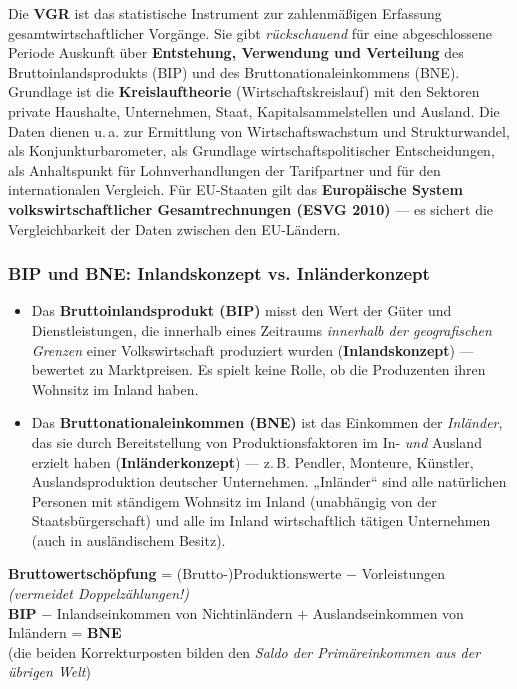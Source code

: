 \documentclass[11pt, a4paper]{article}
\begin{document}
Die \textbf{VGR} ist das statistische Instrument zur zahlenmäßigen Erfassung
gesamtwirtschaftlicher Vorgänge. Sie gibt \emph{rückschauend} für eine abgeschlossene
Periode Auskunft über \textbf{Entstehung, Verwendung und Verteilung} des
Bruttoinlandsprodukts (BIP) und des Bruttonationaleinkommens (BNE). Grundlage ist die
\textbf{Kreislauftheorie} (Wirtschaftskreislauf) mit den Sektoren private Haushalte,
Unternehmen, Staat, Kapitalsammelstellen und Ausland. Die Daten dienen u.\,a. zur
Ermittlung von Wirtschaftswachstum und Strukturwandel, als Konjunkturbarometer, als
Grundlage wirtschaftspolitischer Entscheidungen, als Anhaltspunkt für Lohnverhandlungen
der Tarifpartner und für den internationalen Vergleich. Für EU-Staaten gilt das
\textbf{Europäische System volkswirtschaftlicher Gesamtrechnungen (ESVG 2010)} --- es
sichert die Vergleichbarkeit der Daten zwischen den EU-Ländern.

\subsubsection{BIP und BNE: Inlandskonzept vs. Inländerkonzept}

\begin{itemize}
  \item Das \textbf{Bruttoinlandsprodukt (BIP)} misst den Wert der Güter und
    Dienstleistungen, die innerhalb eines Zeitraums \emph{innerhalb der geografischen
    Grenzen} einer Volkswirtschaft produziert wurden (\textbf{Inlandskonzept}) ---
    bewertet zu Marktpreisen. Es spielt keine Rolle, ob die Produzenten ihren Wohnsitz
    im Inland haben.
  \item Das \textbf{Bruttonationaleinkommen (BNE)} ist das Einkommen der \emph{Inländer},
    das sie durch Bereitstellung von Produktionsfaktoren im In- \emph{und} Ausland
    erzielt haben (\textbf{Inländerkonzept}) --- z.\,B. Pendler, Monteure, Künstler,
    Auslandsproduktion deutscher Unternehmen. „Inländer`` sind alle natürlichen Personen
    mit ständigem Wohnsitz im Inland (unabhängig von der Staatsbürgerschaft) und alle im
    Inland wirtschaftlich tätigen Unternehmen (auch in ausländischem Besitz).
\end{itemize}

\begin{merksatz}[title={\bfseries Formeln: Bruttowertschöpfung und BNE}]
\textbf{Bruttowertschöpfung} = (Brutto-)Produktionswerte $-$ Vorleistungen
\emph{(vermeidet Doppelzählungen!)}\\[0.4em]
\textbf{BIP} $-$ Inlandseinkommen von Nichtinländern $+$ Auslandseinkommen von Inländern
= \textbf{BNE}\\
(die beiden Korrekturposten bilden den \emph{Saldo der Primäreinkommen aus der übrigen
Welt})
\end{merksatz}
\end{document}
